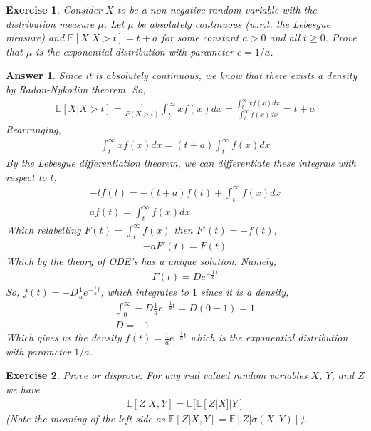 \documentclass[12pt]{article}
\theoremstyle{colon}
\newtheorem{exercise}{Exercise}
\newtheorem*{answer}{Answer}
\begin{document}
\clearpage

\begin{exercise}
  Consider $X$ to be a non-negative random variable with the distribution measure $\mu$. Let $\mu$ be absolutely continuous (w.r.t. the Lebesgue measure) and $\mathbb{E}[X|X > t] = t + a$ for some constant $a > 0$ and all $t \geq 0$. Prove that $\mu$ is the exponential distribution with parameter $c = 1/a$.
\end{exercise}

\begin{answer}
  Since it is absolutely continuous, we know that there exists a density by Radon-Nykodim theorem. So,
  \begin{gather*}
    \mathbb{E}[X|X > t] = \frac{1}{P(X > t)} \int_t^\infty x f(x) dx = \frac{\int_t^\infty x f(x) dx}{\int_t^\infty f(x) dx} =  t+a
  \end{gather*}
  Rearranging,
  \begin{gather*}
    \int_t^\infty x f(x) dx =  (t+a)\int_t^\infty f(x) dx
  \end{gather*}
  By the Lebesgue differentiation theorem, we can differentiate these integrals with respect to $t$,
  \begin{gather*}
    -t f(t) =  -(t+a)f(t) + \int_t^\infty f(x) dx \\
    a f(t) = \int_t^\infty f(x) dx
  \end{gather*}
  Which relabelling $F(t) = \int_t^\infty f(x)$ then $F'(t) = -f(t)$,
  \begin{gather*}
    -a F'(t) = F(t)
  \end{gather*}
  Which by the theory of ODE's has a unique solution. Namely,
  \begin{gather*}
    F(t) = De^{-\frac{1}{a}t}
  \end{gather*}
  So, $f(t) = -D \frac{1}{a} e^{-\frac{1}{a}t}$, which integrates to $1$ since it is a density,
  \begin{gather*}
    \int_0^\infty -D \frac{1}{a} e^{-\frac{1}{a}t} = D (0 - 1) = 1 \\
    D = -1
  \end{gather*}
  Which gives us the density $f(t) = \frac{1}{a} e^{-\frac{1}{a}t}$ which is the exponential distribution with parameter $1/a$.
\end{answer}

\clearpage

\begin{exercise}
  Prove or disprove: For any real valued random variables $X$, $Y$, and $Z$ we have
  \begin{gather*}
    \mathbb{E}[Z | X,Y] = \mathbb{E}[\mathbb{E}[Z | X] | Y]
  \end{gather*}
  (Note the meaning of the left side as $\mathbb{E}[Z | X,Y] = \mathbb{E}[Z | \sigma(X,Y)]$).
\end{exercise}
\end{document}
